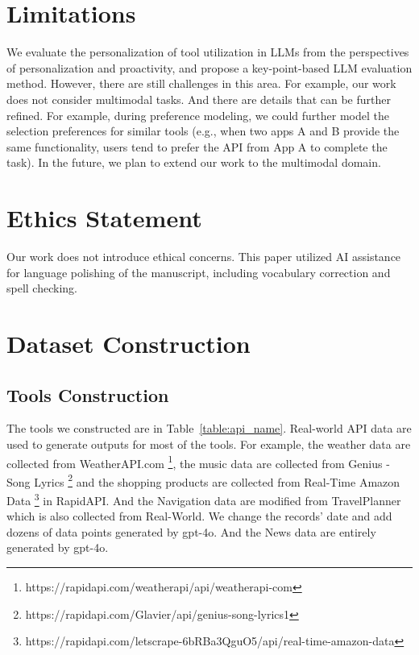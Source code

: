 \documentclass[11pt]{article}
\begin{document}
\section*{Limitations}
We evaluate the personalization of tool utilization in LLMs from the perspectives of personalization and proactivity, and propose a key-point-based LLM evaluation method. However, there are still challenges in this area. For example, our work does not consider multimodal tasks. And there are details that can be further refined. For example, during preference modeling, we could further model the selection preferences for similar tools (e.g., when two apps A and B provide the same functionality, users tend to prefer the API from App A to complete the task). In the future, we plan to extend our work to the multimodal domain.

\section*{Ethics Statement}
Our work does not introduce ethical concerns. This paper utilized AI assistance for language polishing of the manuscript, including vocabulary correction and spell checking.


%

\newpage
\appendix


\section{Dataset Construction}
\label{sec:dataset_construction}

\subsection{Tools Construction}
The tools we constructed are in Table~\ref{table:api_name}. Real-world API data are used to generate outputs for most of the tools. For example, the weather data are collected from WeatherAPI.com \footnote{https://rapidapi.com/weatherapi/api/weatherapi-com}, the music data are collected from 
Genius - Song Lyrics \footnote{https://rapidapi.com/Glavier/api/genius-song-lyrics1}  and the shopping products are collected from Real-Time Amazon Data \footnote{https://rapidapi.com/letscrape-6bRBa3QguO5/api/real-time-amazon-data} in RapidAPI. And the Navigation data are modified from TravelPlanner \cite{xie2024travelplanner} which is also collected from Real-World. We change the records' date and add dozens of data points generated by gpt-4o. And the News data are entirely generated by gpt-4o.   
\end{document}
